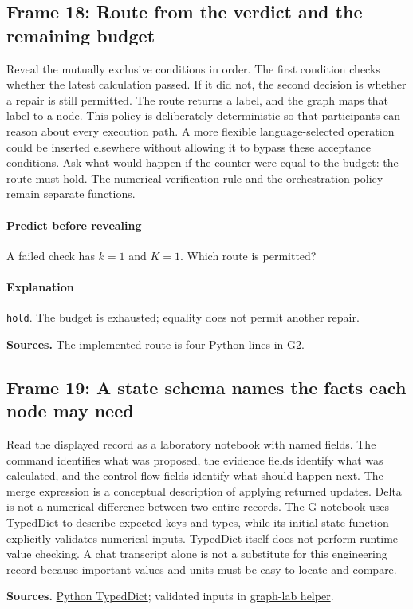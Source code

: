 \documentclass[11pt]{article}
\begin{document}
\subsection*{Frame 18: Route from the verdict and the remaining budget}
Reveal the mutually exclusive conditions in order. The first condition checks whether the latest calculation passed. If it did not, the second decision is whether a repair is still permitted. The route returns a label, and the graph maps that label to a node. This policy is deliberately deterministic so that participants can reason about every execution path. A more flexible language-selected operation could be inserted elsewhere without allowing it to bypass these acceptance conditions. Ask what would happen if the counter were equal to the budget: the route must hold. The numerical verification rule and the orchestration policy remain separate functions.\par
\paragraph{Predict before revealing}A failed check has \(k=1\) and \(K=1\). Which route is permitted?
\paragraph{Explanation}\texttt{hold}. The budget is exhausted; equality does not permit another repair.
\par\nopagebreak\begin{minipage}{\linewidth}{\footnotesize\color{slate}\textbf{Sources.} The implemented route is four Python lines in \href{../Graph_Workflow_Lab.ipynb}{G2}.\par}\end{minipage}\par\medskip
\subsection*{Frame 19: A state schema names the facts each node may need}
Read the displayed record as a laboratory notebook with named fields. The command identifies what was proposed, the evidence fields identify what was calculated, and the control-flow fields identify what should happen next. The merge expression is a conceptual description of applying returned updates. Delta is not a numerical difference between two entire records. The G notebook uses TypedDict to describe expected keys and types, while its initial-state function explicitly validates numerical inputs. TypedDict itself does not perform runtime value checking. A chat transcript alone is not a substitute for this engineering record because important values and units must be easy to locate and compare.\par
\par\nopagebreak\begin{minipage}{\linewidth}{\footnotesize\color{slate}\textbf{Sources.} \href{https://docs.python.org/3/library/typing.html}{Python TypedDict}; validated inputs in \href{../src/graph_workflow_lab.py}{graph-lab helper}.\par}\end{minipage}\par\medskip
\end{document}
